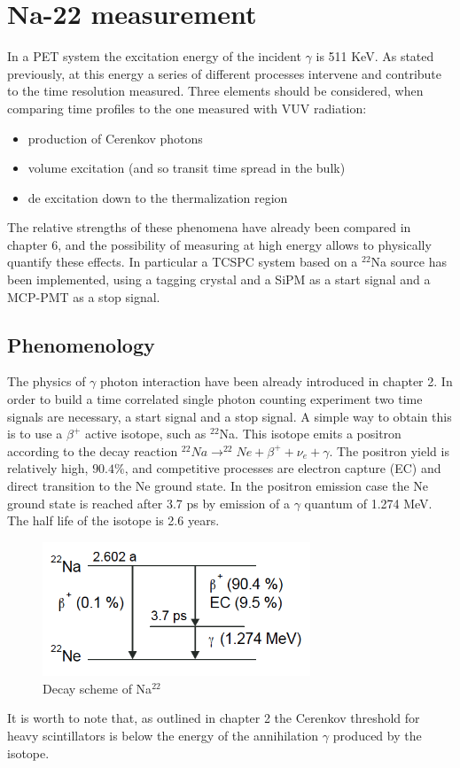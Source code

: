 \chapter{Na-22 measurement}

In a PET system the excitation energy of the incident $\gamma$ is 511 KeV. As stated previously, at this energy a series of different processes intervene and contribute to the time resolution measured.
Three elements should be considered, when comparing time profiles to the one measured with VUV radiation:
\begin{itemize}
\item production of Cerenkov photons
\item volume excitation (and so transit time spread in the bulk)
\item de excitation down to the thermalization region
\end{itemize}
The relative strengths of these phenomena have already been compared in chapter 6, and the possibility of measuring at high energy allows to physically quantify these effects.
In particular a TCSPC system based on a $^{22}$Na source has been implemented, using a tagging crystal and a SiPM as a start signal and a MCP-PMT as a stop signal. 

\section{Phenomenology}

The physics of $\gamma$ photon interaction have been already introduced in chapter 2.
In order to build a time correlated single photon counting experiment two time signals are necessary, a start signal and a stop signal.
A simple way to obtain this is to use a $\beta ^{+}$ active isotope, such as $^{22}$Na. This isotope emits a positron according to the decay reaction $^{22}Na \rightarrow ^{22}Ne + \beta ^{+} + \nu _{e} + \gamma$. The positron yield is relatively high, $90.4\%$, and competitive processes are electron capture (EC) and direct transition to the Ne ground state. 
In the positron emission case the Ne ground state is reached after 3.7 ps by emission of a $\gamma$ quantum of 1.274 MeV. The half life of the isotope is 2.6 years.
\begin{figure}[htbp]
\begin{center}
\includegraphics[width=8cm]{../Pictures/Chapter_8/Na-22}
\end{center}
\caption[Na$^{22}$ decay scheme]{Decay scheme of Na$^{22}$}
\label{fig:Na_22}
\end{figure}
It is worth to note that, as outlined in chapter 2 the Cerenkov threshold for heavy scintillators is below the energy of the annihilation $\gamma$ produced by the isotope.

